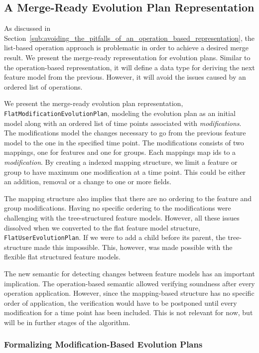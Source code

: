 \documentclass[a4paper,english]{ifimaster}
\begin{document}
\subsection{A Merge-Ready Evolution Plan Representation}%
\label{sub:a_merge_ready_evolution_plan_representation}

As discussed in Section~\ref{sub:avoiding_the_pitfalls_of_an_operation_based_representation}, the list-based operation approach is problematic in order to achieve a desired merge result. We present the merge-ready representation for evolution plans. Similar to the operation-based representation, it will define a data type for deriving the next feature model from the previous. However, it will avoid the issues caused by an ordered list of operations.

We present the merge-ready evolution plan representation, \texttt{Flat\-Modification\-Evolution\-Plan}, modeling the evolution plan as an initial model along with an ordered list of time points associated with \textit{modifications}. The modifications model the changes necessary to go from the previous feature model to the one in the specified time point. The modifications consists of two mappings, one for features and one for groups. Each mappings map ids to a \textit{modification}. By creating a indexed mapping structure, we limit a feature or group to have maximum one modification at a time point. This could be either an addition, removal or a change to one or more fields. 

The mapping structure also implies that there are no ordering to the feature and group modifications. Having no specific ordering to the modifications were challenging with the tree-structured feature models. However, all these issues dissolved when we converted to the flat feature model structure, \texttt{Flat\-User\-Evolution\-Plan}. If we were to add a child before its parent, the tree-structure made this impossible. This, however, was made possible with the flexible flat structured feature models.

The new semantic for detecting changes between feature models has an important implication. The operation-based semantic allowed verifying soundness after every operation application. However, since the mapping-based structure has no specific order of application, the verification would have to be postponed until every modification for a time point has been included. This is not relevant for now, but will be in further stages of the algorithm.

\subsubsection{Formalizing Modification-Based Evolution Plans}%
\label{ssub:formalizing_modification_based_evolution_plans}
\end{document}
